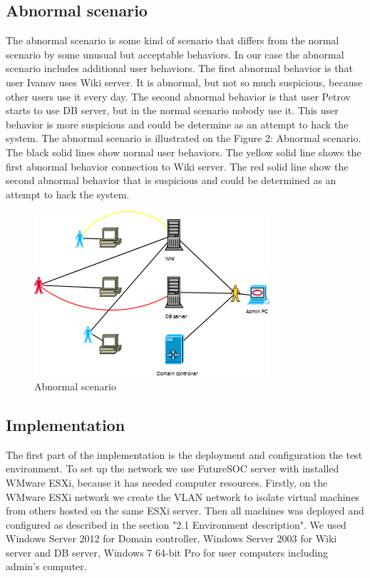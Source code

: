 \subsection{Abnormal scenario}
The abnormal scenario is some kind of scenario that differs from the normal scenario by some unusual but acceptable behaviors. In our case the abnormal scenario includes additional user behaviors. The first abnormal behavior is that user Ivanov uses Wiki server. It is abnormal, but not so much suspicious, because other users use it every day. The second abnormal behavior is that user Petrov starts to use DB server, but in the normal scenario nobody use it. This user  behavior is more suspicious and could be determine as an attempt to hack the system. The abnormal scenario is illustrated on the Figure 2: Abnormal scenario. The black solid lines show normal user behaviors. The yellow solid line shows the first abnormal behavior connection to Wiki server. The red solid line show the second abnormal behavior that is suspicious and could be determined as an attempt to hack the system. 
\begin{figure}[ht!]
\centering
\includegraphics{scenario_abnormal.png}
\caption{Abnormal scenario}
\label{overflow}
\end{figure}

\subsection{Implementation}
The first part of the implementation is the deployment and configuration the test environment. To set up the network we use FutureSOC server with installed WMware ESXi, because it has needed computer resources. Firstly, on the WMware ESXi network we create the VLAN network to isolate virtual machines from others hosted on the same ESXi server. Then all machines was deployed and configured as described in the section "2.1 Environment description". We used Windows Server 2012 for Domain controller, Windows Server 2003 for Wiki server and DB server, Windows 7 64-bit Pro for user computers including admin's computer. 


